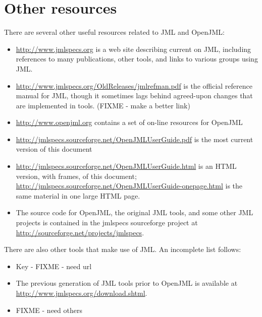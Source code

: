 \chapter{Other resources}

There are several other useful resources related to JML and OpenJML:
\begin{itemize}
\item \url{http://www.jmlspecs.org} is a web site describing current on JML, including references to many publications, other tools, and links to various groups using JML.
\item \url{http://www.jmlspecs.org/OldReleases/jmlrefman.pdf} is the official reference manual for JML, though it sometimes lags behind agreed-upon changes that are implemented in tools. (FIXME - make a better link)
\item \url{http://www.openjml.org} contains a set of on-line resources for OpenJML
\item \url{http://jmlspecs.sourceforge.net/OpenJMLUserGuide.pdf} is the most current version of this document
\item \url{http://jmlspecs.sourceforge.net/OpenJMLUserGuide.html} is an HTML version, with frames, of this document; \url{http://jmlspecs.sourceforge.net/OpenJMLUserGuide-onepage.html} is the same material in one large HTML page.
\item The source code for OpenJML, the original JML tools, and some other JML projects is contained in the jmlspecs sourceforge project at \url{http://sourceforge.net/projects/jmlspecs}.
\end{itemize}

There are also other tools that make use of JML. An incomplete list follows:
\begin{itemize}
\item Key - FIXME - need url
\item The previous generation of JML tools prior to OpenJML is available at \url{http://www.jmlspecs.org/download.shtml}.
\item FIXME - need others
\end{itemize}